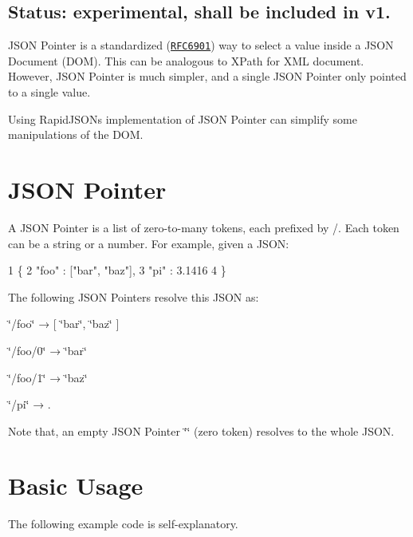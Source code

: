 \subsection*{Status\+: experimental, shall be included in v1.}

J\+S\+ON Pointer is a standardized (\href{https://tools.ietf.org/html/rfc6901}{\tt R\+F\+C6901}) way to select a value inside a J\+S\+ON Document (D\+OM). This can be analogous to X\+Path for X\+ML document. However, J\+S\+ON Pointer is much simpler, and a single J\+S\+ON Pointer only pointed to a single value.

Using Rapid\+J\+S\+ON\textquotesingle{}s implementation of J\+S\+ON Pointer can simplify some manipulations of the D\+OM.\hypertarget{md_Commun_Externe_RapidJSON_doc_pointer_JsonPointer}{}\section{J\+S\+O\+N Pointer}\label{md_Commun_Externe_RapidJSON_doc_pointer_JsonPointer}
A J\+S\+ON Pointer is a list of zero-\/to-\/many tokens, each prefixed by {\ttfamily /}. Each token can be a string or a number. For example, given a J\+S\+ON\+: 
\begin{DoxyCode}
1 \{
2     "foo" : ["bar", "baz"],
3     "pi" : 3.1416
4 \}
\end{DoxyCode}


The following J\+S\+ON Pointers resolve this J\+S\+ON as\+:


\begin{DoxyEnumerate}
\item {\ttfamily \char`\"{}/foo\char`\"{}} → {\ttfamily \mbox{[} \char`\"{}bar\char`\"{}, \char`\"{}baz\char`\"{} \mbox{]}}
\item {\ttfamily \char`\"{}/foo/0\char`\"{}} → {\ttfamily \char`\"{}bar\char`\"{}}
\item {\ttfamily \char`\"{}/foo/1\char`\"{}} → {\ttfamily \char`\"{}baz\char`\"{}}
\item {\ttfamily \char`\"{}/pi\char`\"{}} → {.}
\end{DoxyEnumerate}

Note that, an empty J\+S\+ON Pointer {\ttfamily \char`\"{}\char`\"{}} (zero token) resolves to the whole J\+S\+ON.\hypertarget{md_Commun_Externe_RapidJSON_doc_pointer_BasicUsage}{}\section{Basic Usage}\label{md_Commun_Externe_RapidJSON_doc_pointer_BasicUsage}
The following example code is self-\/explanatory.


